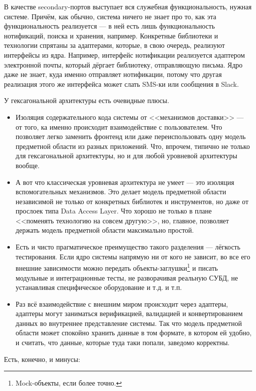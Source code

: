 \documentclass{../../text-style}
\begin{document}
В качестве secondary-портов выступает вся служебная функциональность, нужная системе. Причём, как обычно, система ничего не знает про то, как эта функциональность реализуется --- в ней есть лишь функциональность нотификаций, поиска и хранения, например. Конкретные библиотеки и технологии спрятаны за адаптерами, которые, в свою очередь, реализуют интерфейсы из ядра. Например, интерфейс нотификации реализуется адаптером электронной почты, который дёргает библиотеку, отправляющую письма. Ядро даже не знает, куда именно отправляет нотификации, потому что другая реализация этого же интерфейса может слать SMS-ки или сообщения в Slack.

У гексагональной архитектуры есть очевидные плюсы.

\begin{itemize}
    \item Изоляция содержательного кода системы от <<механизмов доставки>> --- от того, ка именно происходит взаимодействие с пользователем. Что позволяет легко заменить фронтенд или даже переиспользовать одну модель предметной области из разных приложений. Что, впрочем, типично не только для гексагональной архитектуры, но и для любой уровневой архитектуры вообще.
    \item А вот что классическая уровневая архитектура не умеет --- это изоляция вспомогательных механизмов. Это делает модель предметной области независимой не только от конкретных библиотек и инструментов, но даже от прослоек типа Data Access Layer. Что хорошо не только в плане <<поменять технологию на совсем другую>>, но, главное, позволяет держать модель предметной области максимально простой.
    \item Есть и чисто прагматическое преимущество такого разделения --- лёгкость тестирования. Если ядро системы напрямую ни от кого не зависит, во все его внешние зависимости можно передать объекты-заглушки\footnote{Mock-объекты, если более точно.} и писать модульные и интеграционные тесты, не разворачивая реальную СУБД, не устанавливая специфическое оборудование и т.д. и т.п.
    \item Раз всё взаимодействие с внешним миром происходит через адаптеры, адаптеры могут заниматься верификацией, валидацией и конвертированием данных во внутреннее представление системы. Так что модель предметной области может спокойно хранить данные в том формате, в котором ей удобно, и считать, что данные, которые туда таки попали, заведомо корректны.
\end{itemize}

Есть, конечно, и минусы:
\end{document}
